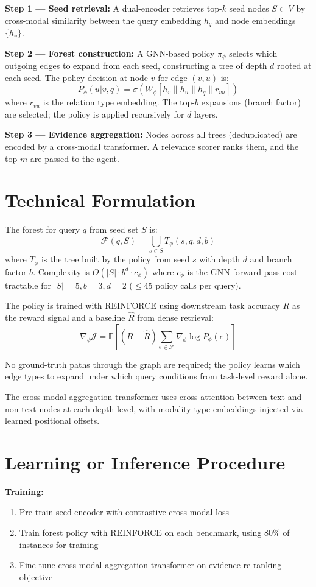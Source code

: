 \documentclass[10pt,twocolumn]{article}
\begin{document}
\textbf{Step 1 — Seed retrieval:} A dual-encoder retrieves top-$k$
seed nodes $S \subset V$ by cross-modal similarity between the
query embedding $h_q$ and node embeddings $\{h_v\}$.

\textbf{Step 2 — Forest construction:} A GNN-based policy
$\pi_\phi$ selects which outgoing edges to expand from each seed,
constructing a tree of depth $d$ rooted at each seed. The policy
decision at node $v$ for edge $(v, u)$ is:
\[
  P_\phi(u | v, q) = \sigma\left(W_\phi [h_v \| h_u \| h_q \| r_{vu}]\right)
\]
where $r_{vu}$ is the relation type embedding. The top-$b$ expansions
(branch factor) are selected; the policy is applied recursively for
$d$ layers.

\textbf{Step 3 — Evidence aggregation:} Nodes across all trees
(deduplicated) are encoded by a cross-modal transformer. A relevance
scorer ranks them, and the top-$m$ are passed to the agent.

\section{Technical Formulation}

The forest for query $q$ from seed set $S$ is:
\[
  \mathcal{F}(q, S) = \bigcup_{s \in S} T_\phi(s, q, d, b)
\]
where $T_\phi$ is the tree built by the policy from seed $s$ with
depth $d$ and branch factor $b$. Complexity is
$O(|S| \cdot b^d \cdot c_\phi)$ where $c_\phi$ is the GNN forward
pass cost — tractable for $|S|=5, b=3, d=2$ ($\leq$45 policy calls
per query).

The policy is trained with REINFORCE using downstream task accuracy
$R$ as the reward signal and a baseline $\hat{R}$ from dense
retrieval:
\[
  \nabla_\phi \mathcal{J} = \mathbb{E}\left[(R - \hat{R})
    \sum_{e \in \mathcal{F}} \nabla_\phi \log P_\phi(e)\right]
\]

No ground-truth paths through the graph are required; the policy
learns which edge types to expand under which query conditions from
task-level reward alone.

The cross-modal aggregation transformer uses cross-attention between
text and non-text nodes at each depth level, with modality-type
embeddings injected via learned positional offsets.

\section{Learning or Inference Procedure}

\textbf{Training:}
\begin{enumerate}[itemsep=2pt,parsep=0pt]
  \item Pre-train seed encoder with contrastive cross-modal loss
  \item Train forest policy with REINFORCE on each benchmark,
    using 80\% of instances for training
  \item Fine-tune cross-modal aggregation transformer on evidence
    re-ranking objective
\end{enumerate}
\end{document}

